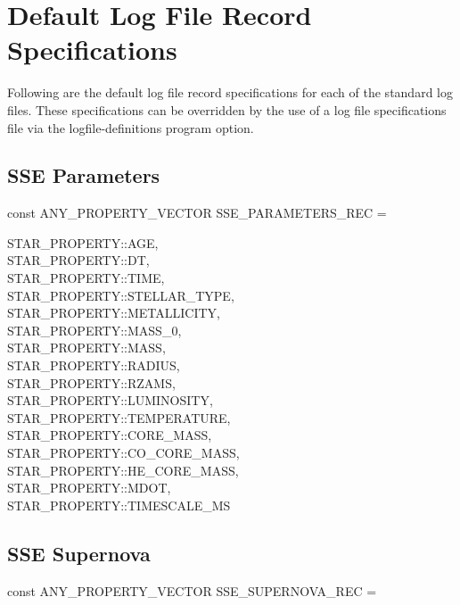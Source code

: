 \newpage
\section{Default Log File Record Specifications}\label{sec:DefaultLogFileRecordSpecs}

Following are the default log file record specifications for each of the standard log files.  These specifications can be overridden by the use of a log file specifications file via the logfile-definitions program option.


\subsection{SSE Parameters}\label{sec:SSEParameters}

const ANY\_PROPERTY\_VECTOR SSE\_PARAMETERS\_REC = \lcb

\hfill
\begin{minipage}{\dimexpr\textwidth-2em}
    STAR\_PROPERTY::AGE, \\
    STAR\_PROPERTY::DT, \\
    STAR\_PROPERTY::TIME, \\
    STAR\_PROPERTY::STELLAR\_TYPE, \\
    STAR\_PROPERTY::METALLICITY, \\
    STAR\_PROPERTY::MASS\_0, \\
    STAR\_PROPERTY::MASS, \\
    STAR\_PROPERTY::RADIUS, \\
    STAR\_PROPERTY::RZAMS, \\
    STAR\_PROPERTY::LUMINOSITY, \\
    STAR\_PROPERTY::TEMPERATURE, \\
    STAR\_PROPERTY::CORE\_MASS, \\
    STAR\_PROPERTY::CO\_CORE\_MASS, \\
    STAR\_PROPERTY::HE\_CORE\_MASS, \\
    STAR\_PROPERTY::MDOT, \\
    STAR\_PROPERTY::TIMESCALE\_MS
\end{minipage}
\par\rcb{;}

\newpage
\subsection{SSE Supernova}\label{sec:SSESupernova}

const ANY\_PROPERTY\_VECTOR SSE\_SUPERNOVA\_REC = \lcb

